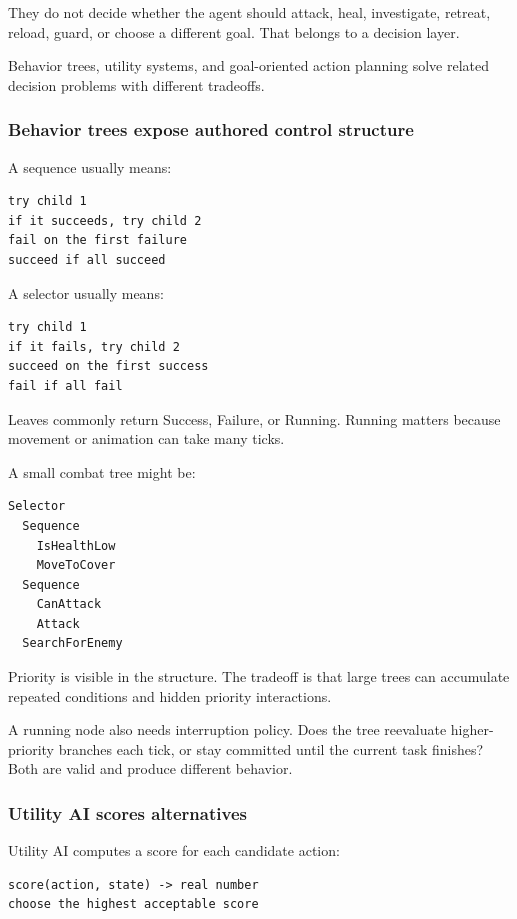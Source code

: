 They do not decide whether the agent should attack, heal, investigate, retreat, reload, guard, or choose a different goal. That belongs to a decision layer.

Behavior trees, utility systems, and goal-oriented action planning solve related decision problems with different tradeoffs.

\subsubsection{Behavior trees expose authored control structure}\label{behavior-trees-expose-authored-control-structure}

A sequence usually means:

\begin{verbatim}
try child 1
if it succeeds, try child 2
fail on the first failure
succeed if all succeed
\end{verbatim}

A selector usually means:

\begin{verbatim}
try child 1
if it fails, try child 2
succeed on the first success
fail if all fail
\end{verbatim}

Leaves commonly return Success, Failure, or Running. Running matters because movement or animation can take many ticks.

A small combat tree might be:

\begin{verbatim}
Selector
  Sequence
    IsHealthLow
    MoveToCover
  Sequence
    CanAttack
    Attack
  SearchForEnemy
\end{verbatim}

Priority is visible in the structure. The tradeoff is that large trees can accumulate repeated conditions and hidden priority interactions.

A running node also needs interruption policy. Does the tree reevaluate higher-priority branches each tick, or stay committed until the current task finishes? Both are valid and produce different behavior.

\subsubsection{Utility AI scores alternatives}\label{utility-ai-scores-alternatives}

Utility AI computes a score for each candidate action:

\begin{verbatim}
score(action, state) -> real number
choose the highest acceptable score
\end{verbatim}

